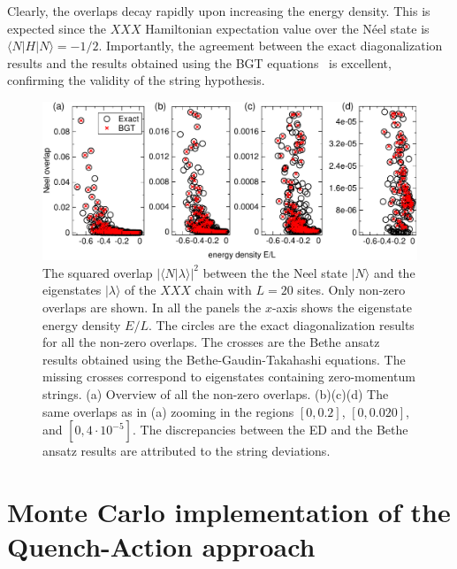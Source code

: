 \documentclass[11pt]{iopart}
\begin{document}
Clearly, the overlaps decay rapidly upon increasing the energy density. 
This is expected since the $XXX$ Hamiltonian expectation value over 
the N\'eel state is $\langle N|{H}|N\rangle=-1/2$. Importantly, the 
agreement between the exact diagonalization results and the results 
obtained using the BGT equations~ is excellent, confirming 
the validity of the string hypothesis. 


\begin{figure}[t]
\begin{center}
\includegraphics[width=.9\textwidth]{./draft_figs/L20_BT_check}
\end{center}
\caption{ The squared overlap $|\langle N|\lambda\rangle|^2$ between the the 
 Neel state $|N\rangle$ and the eigenstates $|\lambda\rangle$ of the $XXX$ 
 chain with $L=20$ sites. Only non-zero overlaps are shown. In all the panels the 
 $x$-axis shows the eigenstate energy density $E/L$. The circles are the exact 
 diagonalization results for all the non-zero overlaps. The crosses are the Bethe 
 ansatz results obtained using the Bethe-Gaudin-Takahashi equations. The missing 
 crosses correspond to eigenstates containing zero-momentum strings. (a) Overview 
 of all the non-zero overlaps. (b)(c)(d) The same overlaps as in (a) zooming in 
 the regions $[0,0.2]$, $[0,0.020]$, and $[0,4\cdot 10^{-5}]$. The discrepancies 
 between the ED and the Bethe ansatz results are attributed to the string 
 deviations. 
}
\label{fig1-BGT-check}
\end{figure}



\section{Monte Carlo implementation of the Quench-Action approach}
\end{document}
